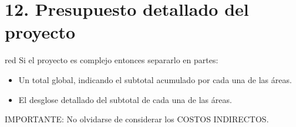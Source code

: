\documentclass[
11pt%
]{charter}
\begin{document}



\flushleft

\section{12. Presupuesto detallado del proyecto}
\label{sec:presupuesto}

\begin{consigna}{red}
Si el proyecto es complejo entonces separarlo en partes:
\begin{itemize}
	\item Un total global, indicando el subtotal acumulado por cada una de las áreas.
	\item El desglose detallado del subtotal de cada una de las áreas.
\end{itemize}

IMPORTANTE: No olvidarse de considerar los COSTOS INDIRECTOS.

\end{consigna}
\end{document}

